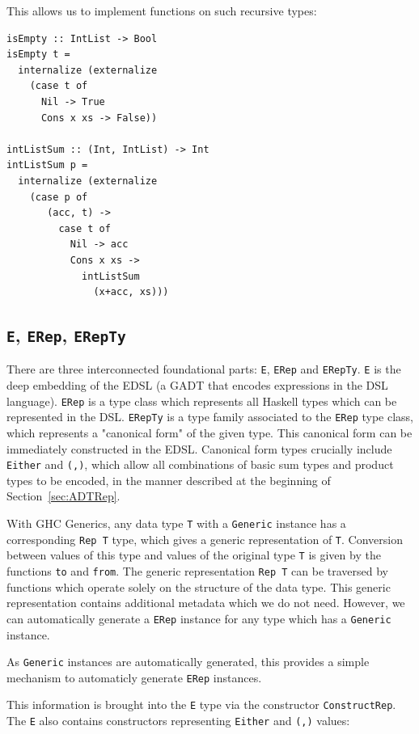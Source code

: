 \documentclass[runningheads, a4paper]{llncs}
\newcommand{\ttt}{\texttt}
\begin{document}
This allows us to implement functions on such recursive types:

\begin{lstlisting}
isEmpty :: IntList -> Bool
isEmpty t =
  internalize (externalize
    (case t of
      Nil -> True
      Cons x xs -> False))

intListSum :: (Int, IntList) -> Int
intListSum p =
  internalize (externalize
    (case p of
       (acc, t) ->
         case t of
           Nil -> acc
           Cons x xs ->
             intListSum
               (x+acc, xs)))
\end{lstlisting}

\subsection{\ttt{E}, \ttt{ERep}, \ttt{ERepTy}}

There are three interconnected foundational parts: \ttt{E}, \ttt{ERep} and
\ttt{ERepTy}. \ttt{E} is the deep embedding of the EDSL (a GADT that encodes
expressions in the DSL language). \ttt{ERep} is a type class which represents
all Haskell types which can be represented in the DSL. \ttt{ERepTy} is a type
family associated to the \ttt{ERep} type class, which represents a "canonical form"
of the given type. This canonical form can be immediately constructed in the EDSL.
Canonical form types crucially include \ttt{Either} and \ttt{(,)}, which
allow all combinations of basic sum types and product types to be encoded, in the
manner described at the beginning of Section~\ref{sec:ADTRep}.

With GHC Generics, any data type \ttt{T} with a \ttt{Generic} instance has a
corresponding \ttt{Rep T} type, which gives a generic representation of \ttt{T}.
Conversion between values of this type and values of the original type \ttt{T} is
given by the functions \ttt{to} and \ttt{from}. The generic representation \ttt{Rep T}
can be traversed by functions which operate solely on the structure of the data type.
This generic representation contains additional metadata which we do not need.
However, we can automatically generate a \ttt{ERep} instance for any type which
has a \ttt{Generic} instance.

As \ttt{Generic} instances are automatically generated, this provides a simple mechanism
to automaticly generate \ttt{ERep} instances.


This information is brought into the \ttt{E} type via the constructor
\ttt{ConstructRep}. The \ttt{E} also contains constructors representing \ttt{Either}
and \ttt{(,)} values:
\end{document}
